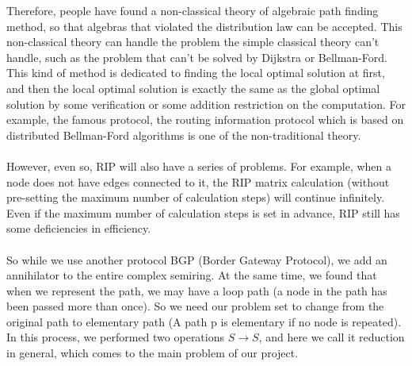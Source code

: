 \documentclass[a4paper,12pt,twoside,openright]{report}
\begin{document}
Therefore, people have found a non-classical theory of algebraic path finding method, so that algebras that violated the distribution law can be accepted. This non-classical theory can handle the problem the simple classical theory can't handle, such as the problem that can't be solved by Dijkstra or Bellman-Ford.
This kind of method is dedicated to finding the local optimal solution at first, and then the local optimal solution is exactly the same as the global optimal solution by some verification or some addition restriction on the computation. For example, the famous protocol, the routing information protocol which is based on distributed Bellman-Ford algorithms is one of the non-traditional theory.\\\\
However, even so, RIP will also have a series of problems. For example, when a node does not have edges connected to it, the RIP matrix calculation (without pre-setting the maximum number of calculation steps) will continue infinitely. Even if the maximum number of calculation steps is set in advance, RIP still has some deficiencies in efficiency. \\\\
So while we use another protocol BGP (Border Gateway Protocol), we add an annihilator to the entire complex semiring.  At the same time, we found that when we represent the path, we may have a loop path (a node in the path has been passed more than once). So we need our problem set to change from the original path to elementary path (A path p is elementary if no node is repeated). In this process, we performed two operations $S \rightarrow S$, and here we call it reduction in general, which comes to the main problem of our project.\\\\
\end{document}

